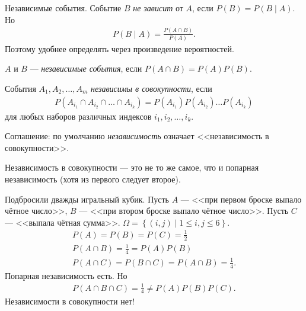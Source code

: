 Независимые события. Событие $B$ \textit{не зависит} от $A$, если $P(B) = P(B \mid A)$. Но
\begin{align*}
 P(B \mid A) = \frac{P(A\cap B)}{P(A)}
.\end{align*} Поэтому удобнее определять через произведение вероятностей.

\begin{df}
 $A$ и $B$ --- \textit{независимые события}, если $P(A \cap B) = P(A)P(B)$.
\end{df}
\begin{df}
 События $A_1, A_2, \ldots, A_m$ \textit{независимы в совокупности}, если
 \begin{align*}
  P(A_{i_1} \cap A_{i_2} \cap \ldots \cap A_{i_k}) = P(A_{i_1}) P(A_{i_2}) \ldots P(A_{i_k})
 \end{align*} для любых наборов различных индексов $i_1, i_2, \ldots, i_k$.
\end{df}
Соглашение: по умолчанию \textit{независимость} означает <<независимость в совокупности>>.
\begin{remrk*}
 Независимость в совокупности --- это не то же самое, что и попарная независимость (хотя из первого следует второе).
\end{remrk*}
\begin{exmpl*}
 Подбросили дважды игральный кубик. Пусть $A$ --- <<при первом броске выпало чётное число>>, $B$ --- <<при втором броске выпало чётное число>>. Пусть $C$ --- <<выпала чётная сумма>>. $\Omega = \left\{ (i,j) \mid 1 \leqslant i,j \leqslant 6 \right\}$.
 \begin{align*}
  P(A) = P(B) = P(C) = \frac{1}{2} \\
  P(A \cap B) = \frac{1}{4} = P(A) P(B) \\
  P(A \cap C) = P(B \cap C) = P(A \cap B) = \frac{1}{4}
 .\end{align*} Попарная независимость есть. Но
 \begin{align*}
  P(A \cap B \cap C) = \frac{1}{4} \neq P(A)P(B)P(C)
 .\end{align*} Независимости в совокупности нет!
\end{exmpl*}

